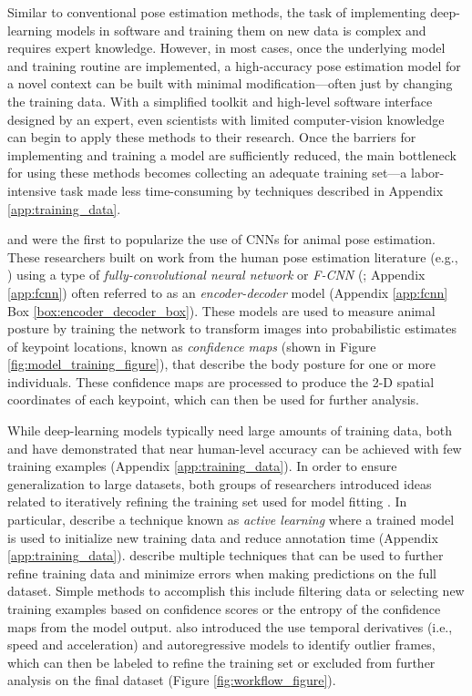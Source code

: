 \documentclass[11pt,a4paper,twoside]{book}
\begin{document}
\begin{doublespace}
Similar to conventional pose estimation methods, the task of implementing deep-learning models in software and training them on new data is complex and requires expert knowledge. However, in most cases, once the underlying model and training routine are implemented, a high-accuracy pose estimation model for a novel context can be built with minimal modification—often just by changing the training data. With a simplified toolkit and high-level software interface designed by an expert, even scientists with limited computer-vision knowledge can begin to apply these methods to their research. Once the barriers for implementing and training a model are sufficiently reduced, the main bottleneck for using these methods becomes collecting an adequate training set—a labor-intensive task made less time-consuming by techniques described in Appendix \ref{app:training_data}.

\cite{mathis2018deeplabcut} and \cite{pereira2019fast} were the first to popularize the use of CNNs for animal pose estimation. These researchers built on work from the human pose estimation literature (e.g., \citealt{andriluka14cvpr,insafutdinov2016deepercut,newell2016}) using a type of \textit{fully-convolutional neural network} or \textit{F-CNN} (\citealt{long2015fully}; Appendix \ref{app:fcnn}) often referred to as an \textit{encoder-decoder} model (Appendix \ref{app:fcnn} Box \ref{box:encoder_decoder_box}). These models are used to measure animal posture by training the network to transform images into probabilistic estimates of keypoint locations, known as \textit{confidence maps} (shown in Figure \ref{fig:model_training_figure}), that describe the body posture for one or more individuals. These confidence maps are processed to produce the 2-D spatial coordinates of each keypoint, which can then be used for further analysis. 

While deep-learning models typically need large amounts of training data, both \cite{mathis2018deeplabcut} and \cite{pereira2019fast} have demonstrated that near human-level accuracy can be achieved with few training examples (Appendix \ref{app:training_data}). In order to ensure generalization to large datasets, both groups of researchers introduced ideas related to iteratively refining the training set used for model fitting \citep{mathis2018deeplabcut, pereira2019fast}. In particular, \cite{pereira2019fast} describe a technique known as \textit{active learning} where a trained model is used to initialize new training data and reduce annotation time (Appendix \ref{app:training_data}). \cite{mathis2018deeplabcut} describe multiple techniques that can be used to further refine training data and minimize errors when making predictions on the full dataset. Simple methods to accomplish this include filtering data or selecting new training examples based on confidence scores or the entropy of the confidence maps from the model output. \cite{nath2018} also introduced the use temporal derivatives (i.e., speed and acceleration) and autoregressive models to identify outlier frames, which can then be labeled to refine the training set or excluded from further analysis on the final dataset (Figure \ref{fig:workflow_figure}).


\end{doublespace}
\end{document}
